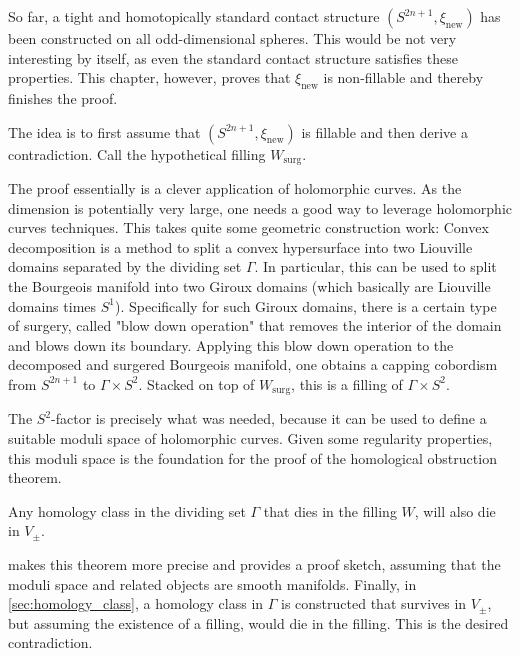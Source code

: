 So far, a tight and homotopically standard contact structure $(S^{2n+1}, \xi_\text{new})$ has been constructed on all odd-dimensional spheres.
This would be not very interesting by itself, as even the standard contact structure satisfies these properties.
This chapter, however, proves that $\xi_\text{new}$ is non-fillable and thereby finishes the proof.

The idea is to first assume that $(S^{2n+1}, \xi_\text{new})$ is fillable and then derive a contradiction.
Call the hypothetical filling $W_\text{surg}$. 

The proof essentially is a clever application of holomorphic curves.
As the dimension is potentially very large, one needs a good way to leverage holomorphic curves techniques.
This takes quite some geometric construction work: 
Convex decomposition is a method to split a convex hypersurface into two Liouville domains separated by the dividing set $\Gamma$.
In particular, this can be used to split the Bourgeois manifold into two Giroux domains (which basically are Liouville domains times $S^1$).
Specifically for such Giroux domains, there is a certain type of surgery, called "blow down operation" that removes the
interior of the domain and blows down its boundary.
Applying this blow down operation to the decomposed and surgered Bourgeois manifold, one obtains a
capping cobordism from $S^{2n+1}$ to $\Gamma \times S^2$.
Stacked on top of $W_\text{surg}$, this is a filling of $\Gamma \times S^2$.

The $S^2$-factor is precisely what was needed, 
because it can be used to define a suitable moduli space of holomorphic curves. 
Given some regularity properties, this moduli space is the foundation for the proof of the homological obstruction theorem.
\begin{theorem}
    Any homology class in the dividing set $\Gamma$ that dies in the filling $W$, will also die in $V_\pm$.
\end{theorem}
 makes this theorem more precise and provides a proof sketch, assuming that the moduli space and
related objects are smooth manifolds.
Finally, in \cref{sec:homology_class}, a homology class in $\Gamma$ is constructed that survives in $V_\pm$, but assuming
the existence of a filling, would die in the filling. This is the desired contradiction. 
